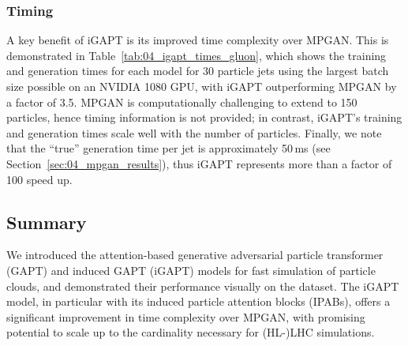 \subsubsection{Timing}

A key benefit of iGAPT is its improved time complexity over MPGAN.
This is demonstrated in Table~\ref{tab:04_igapt_times_gluon}, which shows the training and generation times for each model for 30 particle jets using the largest batch size possible on an NVIDIA 1080 GPU, with iGAPT outperforming MPGAN by a factor of 3.5.
MPGAN is computationally challenging to extend to 150 particles, hence timing information is not provided; in contrast, iGAPT's training and generation times scale well with the number of particles.
Finally, we note that the ``true'' generation time per jet is approximately 50\,ms (see Section~\ref{sec:04_mpgan_results}), thus iGAPT represents more than a factor of 100 speed up.


\begin{table}[htbp!]
\centering
\caption{Timing measurements for MPGAN and iGAPT, measured on an NVIDIA 1080 GPU.}
\label{tab:04_igapt_times_gluon}
\centering{}
\end{table}


\subsection{Summary}

We introduced the attention-based generative adversarial particle transformer (GAPT) and induced GAPT (iGAPT) models for fast simulation of particle clouds, and demonstrated their performance visually on the \jetnet dataset.
The iGAPT model, in particular with its induced particle attention blocks (IPABs), offers a significant improvement in time complexity over MPGAN, with promising potential to scale up to the cardinality necessary for (HL-)LHC simulations.

